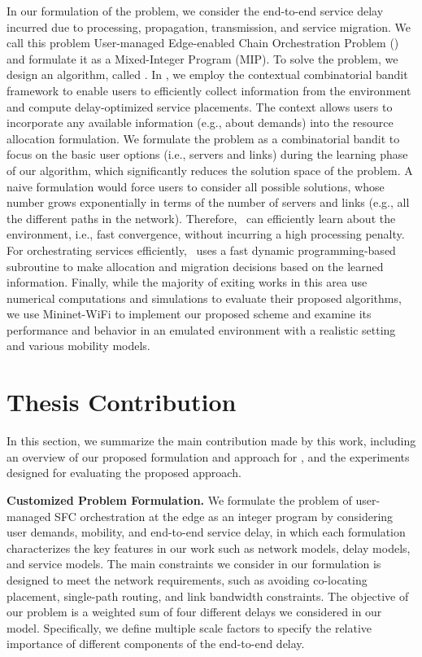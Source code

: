 In our formulation of the problem, we consider the end-to-end service delay incurred due to processing, propagation, transmission, and service migration. We call this problem User-managed Edge-enabled Chain Orchestration Problem (\myproblem) and formulate it as a Mixed-Integer Program (MIP). To solve the problem, we design an algorithm, called \myalgorithm. In \myalgorithm, we employ the contextual combinatorial bandit framework to enable users to efficiently collect information from the environment and compute delay-optimized service placements. The context allows users to incorporate any available information (e.g., about demands) into the resource allocation formulation. We formulate the problem as a combinatorial bandit to focus on the basic user options (i.e., servers and links) during the learning phase of our algorithm, which significantly reduces the solution space of the problem. A naive formulation would force users to consider all possible solutions, whose number grows exponentially in terms of the number of servers and links (e.g., all the different paths in the network). 
Therefore, \myalgorithm\ can efficiently learn about the environment, i.e., fast convergence, without incurring a high processing penalty. For orchestrating services
efficiently, \myalgorithm\ uses a fast dynamic programming-based subroutine to make allocation and migration decisions based on the learned information. Finally, while the majority of exiting works in this area use numerical computations and simulations to evaluate their proposed algorithms, we use Mininet-WiFi to implement our proposed scheme and examine its performance and behavior in an emulated environment with a realistic setting and various mobility models.



\section{Thesis Contribution}
In this section, we summarize the main contribution made by this work, including an overview of our proposed formulation and approach for \myproblem, and the experiments designed for evaluating the proposed approach.

\noindent\textbf{Customized Problem Formulation.}
We formulate the problem of user-managed SFC orchestration at the edge as an integer program by considering user demands, mobility, and end-to-end service delay, in which each formulation characterizes the key features in our work such as network models, delay models, and service models. The main constraints we consider in our formulation is designed to meet the network requirements, such as avoiding co-locating placement, single-path routing, and link bandwidth constraints. The objective of our problem is a weighted sum of four different delays we considered in our model. Specifically, we define multiple scale factors to specify the relative importance of different components of the end-to-end delay.

